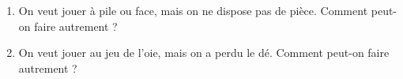 
\begin{enumerate}
\item  On veut jouer à pile ou face, mais on ne dispose pas de pièce. Comment peut-on  
faire autrement ?

\item On veut jouer au jeu de l’oie, mais on a perdu le dé. Comment peut-on faire  
autrement ?
\end{enumerate}
